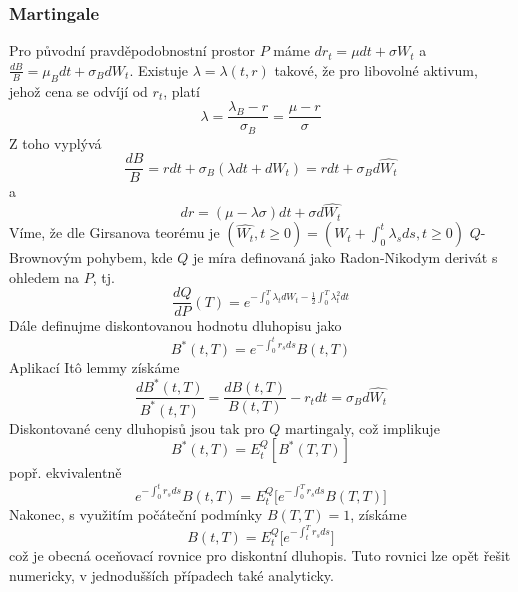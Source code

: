 \documentclass[a4paper]{book}
\begin{document}
\subsubsection{Martingale}

Pro původní pravděpodobnostní prostor $P$ máme $dr_t = \mu dt + \sigma W_t$ a $\frac{dB}{B} = \mu_Bdt + \sigma_B d W_t$. Existuje $\lambda = \lambda(t, r)$ takové, že pro libovolné aktivum, jehož cena se odvíjí od $r_t$, platí
\begin{equation*}
\lambda = \frac{\lambda_B - r}{\sigma_B} = \frac{\mu - r}{\sigma}
\end{equation*}
Z toho vyplývá
\begin{equation*}
\frac{dB}{B} = r dt + \sigma_B(\lambda dt + d W_t) = r dt + \sigma_B d \hat{W_t}
\end{equation*}
a
\begin{equation*}
dr = (\mu - \lambda \sigma)dt + \sigma d \hat{W_t}
\end{equation*}
Víme, že dle Girsanova teorému je $(\hat{W_t}, t \ge 0) = (W_t + \int_0^t \lambda_s ds, t \ge 0)$ $Q$-Brownovým pohybem, kde $Q$ je míra definovaná jako Radon-Nikodym derivát s ohledem na $P$, tj.
\begin{equation*}
\frac{dQ}{dP}(T) = e^{-\int_0^T \lambda_t dW_t - \frac{1}{2}\int_0^T \lambda_t^2 dt}
\end{equation*}
Dále definujme diskontovanou hodnotu dluhopisu jako
\begin{equation*}
B^{*}(t,T) = e^{- \int_0^t r_s ds}B(t,T)
\end{equation*}
Aplikací It\^o lemmy získáme
\begin{equation*}
\frac{d B^{*}(t,T)}{B^{*}(t,T)} = \frac{d B(t,T)}{B(t,T)} - r_t dt = \sigma_B d \hat{W_t}
\end{equation*}
Diskontované ceny dluhopisů jsou tak pro $Q$ martingaly, což implikuje
\begin{equation*}
B^{*}(t,T) = E^Q_t[B^{*}(T,T)]
\end{equation*}
popř. ekvivalentně
\begin{equation*}
e^{-\int_0^t r_s ds}B(t,T) = E_t^Q \Big[ e^{-\int_0^T r_s ds} B(T,T) \Big]
\end{equation*}
Nakonec, s využitím počáteční podmínky $B(T,T) = 1$, získáme
\begin{equation*}
B(t,T) = E_t^Q \Big[ e^{-\int_t^T r_s ds} \Big]
\end{equation*}
což je obecná oceňovací rovnice pro diskontní dluhopis. Tuto rovnici lze opět řešit numericky, v jednodušších případech také analyticky.
\end{document}
